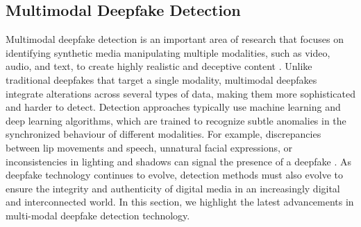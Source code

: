 \subsection{Multimodal Deepfake Detection}
\label{subsec:multimodal_detection}

Multimodal deepfake detection is an important area of research that focuses on identifying synthetic media manipulating multiple modalities, such as video, audio, and text, to create highly realistic and deceptive content \cite{raza2023multimodaltrace, katamneni2023mis, 10081373}. Unlike traditional deepfakes that target a single modality, multimodal deepfakes integrate alterations across several types of data, making them more sophisticated and harder to detect. Detection approaches typically use machine learning and deep learning algorithms, which are trained to recognize subtle anomalies in the synchronized behaviour of different modalities. For example, discrepancies between lip movements and speech, unnatural facial expressions, or inconsistencies in lighting and shadows can signal the presence of a deepfake \cite{lewis2020deepfake}. As deepfake technology continues to evolve, detection methods must also evolve to ensure the integrity and authenticity of digital media in an increasingly digital and interconnected world. In this section, we highlight the latest advancements in multi-modal deepfake detection technology.

